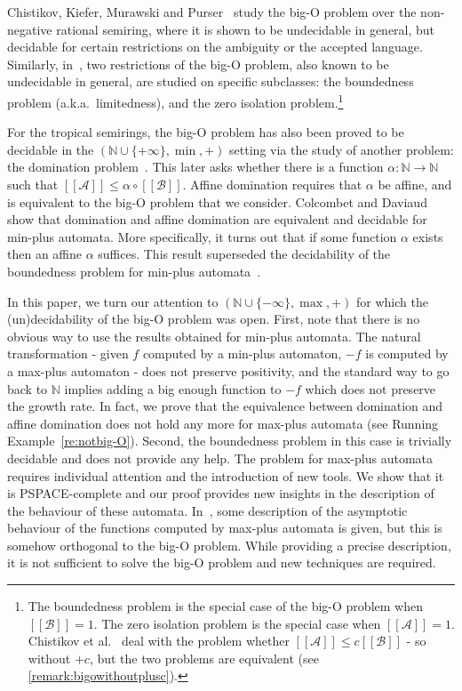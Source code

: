 \documentclass{lmcs}
\theoremstyle{remark}
\newcommand{\autA}{\mathcal{A}}
\newcommand{\autB}{\mathcal{B}}
\newcommand{\brfunc}[1]{[\![#1]\!]}
\newcommand{\funcA}{\brfunc{\autA}}
\newcommand{\funcB}{\brfunc{\autB}}
\theoremstyle{remark}
\begin{document}
Chistikov, Kiefer, Murawski and Purser~\cite{ChistikovKMP20,ChistikovKMP22} study the big-O problem over the non-negative rational semiring, where it is shown to be undecidable in general, but decidable for certain restrictions on the ambiguity or the accepted language. Similarly, in~\cite{CzerwinskiLMPW22}, two restrictions of the big-O problem, also known to be undecidable in general, are studied on specific subclasses: the boundedness problem (a.k.a.~limitedness), and the zero isolation problem.\footnote{The boundedness problem is the special case of the big-O problem when $\funcB = 1$. The zero isolation problem is the special case when $\funcA = 1$. Chistikov et al.~\cite{ChistikovKMP22} deal with the problem whether $\funcA \le c\funcB$ - so without $+c$, but the two problems are equivalent (see \cref{remark:bigowithoutplusc}).}

For the tropical semirings, the big-O problem has also been proved to be decidable in the $(\mathbb{N}\cup\{+\infty\},\min,+)$ setting via the study of another problem: the domination problem~\cite{Colcombet07, Colcombet09}. This later asks whether there is a function $\alpha:\mathbb{N} \to \mathbb{N}$ such that  $\funcA \le \alpha \circ \funcB$. Affine domination requires that $\alpha$ be affine, and is equivalent to the big-O problem that we consider. Colcombet and Daviaud~\cite{ColcombetD13} show that domination and affine domination are equivalent and decidable for min-plus automata. More specifically, it turns out that if some function $\alpha$ exists then an affine $\alpha$ suffices. This result superseded the decidability of the boundedness problem for min-plus automata~\cite{Hashiguchi91a, leung1988topological, Simon94}.

In this paper, we turn our attention to $(\mathbb{N}\cup\{-\infty\},\max,+)$ for which the (un)decidability of the big-O problem was open. First, note that there is no obvious way to use the results obtained for min-plus automata. The natural transformation - given $f$ computed by a min-plus automaton, $-f$ is computed by a max-plus automaton - does not preserve positivity, and the standard way to go back to $\mathbb{N}$ implies adding a big enough function to $-f$ which does not preserve the growth rate. In fact, we prove that the equivalence between domination and affine domination does not hold any more for max-plus automata (see Running Example~\ref{re:notbig-O}). Second, the boundedness problem in this case is trivially decidable and does not provide any help. The problem for max-plus automata requires individual attention and the introduction of new tools. We show that it is PSPACE-complete and our proof provides new insights in the description of the behaviour of these automata. In~\cite{ColcombetDZ14}, some description of the asymptotic behaviour of the functions computed by max-plus automata is given, but this is somehow orthogonal to the big-O problem. While providing a precise description, it is not sufficient to solve the big-O problem and new techniques are required.
\end{document}
